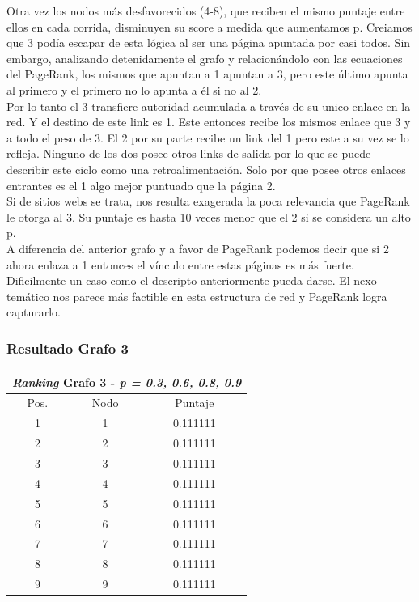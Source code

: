 Otra vez los nodos más desfavorecidos (4-8), que reciben el mismo puntaje entre ellos en cada corrida, disminuyen su score a medida que aumentamos p. Creiamos que 3 podía escapar de esta lógica al ser una página apuntada por casi todos. Sin embargo, analizando detenidamente el grafo y relacionándolo con las ecuaciones del PageRank, los mismos que apuntan a 1 apuntan a 3, pero este último apunta al primero y el primero no lo apunta a él si no al 2. \\

Por lo tanto el 3 transfiere autoridad acumulada a través de su unico enlace en la red. Y el destino de este link es 1. Este entonces recibe los mismos enlace que 3 y a todo el peso de 3. El 2 por su parte recibe un link del 1 pero este a su vez se lo refleja. Ninguno de los dos posee otros links de salida por lo que se puede describir este ciclo como una retroalimentación. Solo por que posee otros enlaces entrantes es el 1 algo mejor puntuado que la página 2. \\

Si de sitios webs se trata, nos resulta exagerada la poca relevancia que PageRank le otorga al 3. Su puntaje es hasta 10 veces menor que el 2 si se considera un alto p.\\
A diferencia del anterior grafo y a favor de PageRank podemos decir que si 2 ahora enlaza a 1 entonces el vínculo entre estas páginas es más fuerte. Dificilmente un caso como el descripto anteriormente pueda darse. El nexo temático nos parece más factible en esta estructura de red y PageRank logra capturarlo. \\

\subsubsection{Resultado Grafo 3}   
            

\begin{center}
         \begin{tabular}{|c|c|c|}
                    \hline
                    \multicolumn{3}{|c||}{\emph{Ranking} Grafo 3 - \emph{p = 0.3, 0.6, 0.8, 0.9}} \\ \hline
Pos. & Nodo & Puntaje \\ \hline
1 & 1 & 0.111111 \\ 
2 & 2 & 0.111111 \\
3 & 3 & 0.111111 \\
4 & 4 & 0.111111 \\
5 & 5 & 0.111111  \\
6 & 6 & 0.111111  \\
7 & 7 & 0.111111   \\
8 & 8 & 0.111111 \\
9 & 9 & 0.111111  \\
 \hline

                \end{tabular}
            \end{center}
 
